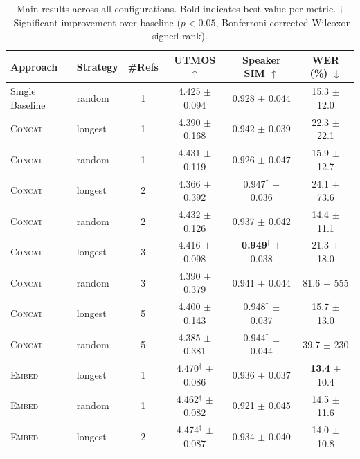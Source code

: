 \documentclass{Interspeech}
\begin{document}
\begin{table}[t]
\centering
\caption{Main results across all configurations.
Bold indicates best value per metric.
$\dagger$~Significant improvement over baseline ($p<0.05$, Bonferroni-corrected Wilcoxon signed-rank).}
\label{tab:main}
\small
\begin{tabular}{llcccc}
\toprule
\textbf{Approach} & \textbf{Strategy} & \textbf{\#Refs} & \textbf{UTMOS} $\uparrow$ & \textbf{Speaker SIM} $\uparrow$ & \textbf{WER (\%)} $\downarrow$ \\
\midrule
Single Baseline & random & 1 & 4.425 \scriptsize{$\pm$ 0.094} & 0.928 \scriptsize{$\pm$ 0.044} & 15.3 \scriptsize{$\pm$ 12.0} \\
\midrule
\textsc{Concat} & longest & 1 & 4.390 \scriptsize{$\pm$ 0.168} & 0.942 \scriptsize{$\pm$ 0.039} & 22.3 \scriptsize{$\pm$ 22.1} \\
\textsc{Concat} & random  & 1 & 4.431 \scriptsize{$\pm$ 0.119} & 0.926 \scriptsize{$\pm$ 0.047} & 15.9 \scriptsize{$\pm$ 12.7} \\
\textsc{Concat} & longest & 2 & 4.366 \scriptsize{$\pm$ 0.392} & 0.947$^\dagger$ \scriptsize{$\pm$ 0.036} & 24.1 \scriptsize{$\pm$ 73.6} \\
\textsc{Concat} & random  & 2 & 4.432 \scriptsize{$\pm$ 0.126} & 0.937 \scriptsize{$\pm$ 0.042} & 14.4 \scriptsize{$\pm$ 11.1} \\
\textsc{Concat} & longest & 3 & 4.416 \scriptsize{$\pm$ 0.098} & \textbf{0.949}$^\dagger$ \scriptsize{$\pm$ 0.038} & 21.3 \scriptsize{$\pm$ 18.0} \\
\textsc{Concat} & random  & 3 & 4.390 \scriptsize{$\pm$ 0.379} & 0.941 \scriptsize{$\pm$ 0.044} & 81.6 \scriptsize{$\pm$ 555} \\
\textsc{Concat} & longest & 5 & 4.400 \scriptsize{$\pm$ 0.143} & 0.948$^\dagger$ \scriptsize{$\pm$ 0.037} & 15.7 \scriptsize{$\pm$ 13.0} \\
\textsc{Concat} & random  & 5 & 4.385 \scriptsize{$\pm$ 0.381} & 0.944$^\dagger$ \scriptsize{$\pm$ 0.044} & 39.7 \scriptsize{$\pm$ 230} \\
\midrule
\textsc{Embed} & longest & 1 & 4.470$^\dagger$ \scriptsize{$\pm$ 0.086} & 0.936 \scriptsize{$\pm$ 0.037} & \textbf{13.4} \scriptsize{$\pm$ 10.4} \\
\textsc{Embed} & random  & 1 & 4.462$^\dagger$ \scriptsize{$\pm$ 0.082} & 0.921 \scriptsize{$\pm$ 0.045} & 14.5 \scriptsize{$\pm$ 11.6} \\
\textsc{Embed} & longest & 2 & 4.474$^\dagger$ \scriptsize{$\pm$ 0.087} & 0.934 \scriptsize{$\pm$ 0.040} & 14.0 \scriptsize{$\pm$ 10.8} \\

\end{tabular}
\end{table}
\end{document}

